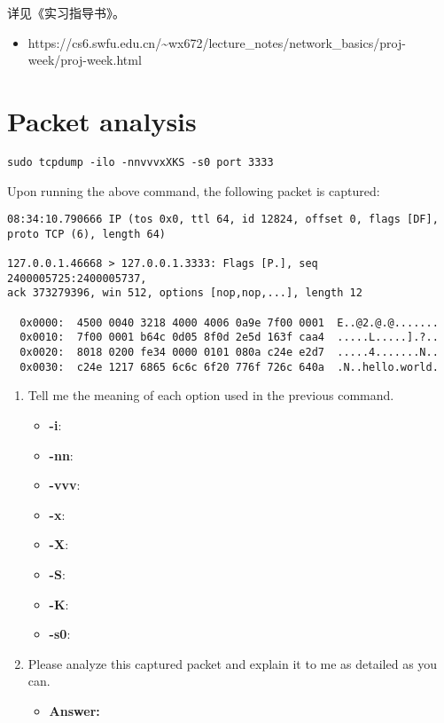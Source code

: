 \documentclass{swfulabreport}
\begin{document}
详见《实习指导书》。

\begin{itemize}
\tightlist
\item
  https://cs6.swfu.edu.cn/\textasciitilde wx672/lecture\_notes/network\_basics/proj-week/proj-week.html
\end{itemize}

\section{Packet analysis}\label{packet-analysis}

\begin{verbatim}
sudo tcpdump -ilo -nnvvvxXKS -s0 port 3333
\end{verbatim}

Upon running the above command, the following packet is captured:

\begin{verbatim}
08:34:10.790666 IP (tos 0x0, ttl 64, id 12824, offset 0, flags [DF],
proto TCP (6), length 64)

127.0.0.1.46668 > 127.0.0.1.3333: Flags [P.], seq 2400005725:2400005737,
ack 373279396, win 512, options [nop,nop,...], length 12

  0x0000:  4500 0040 3218 4000 4006 0a9e 7f00 0001  E..@2.@.@.......
  0x0010:  7f00 0001 b64c 0d05 8f0d 2e5d 163f caa4  .....L.....].?..
  0x0020:  8018 0200 fe34 0000 0101 080a c24e e2d7  .....4.......N..
  0x0030:  c24e 1217 6865 6c6c 6f20 776f 726c 640a  .N..hello.world.
\end{verbatim}

\begin{enumerate}
\def\labelenumi{\arabic{enumi}.}
\item
  Tell me the meaning of each option used in the previous command.

  \begin{itemize}
  \tightlist
  \item
    \textbf{-i}:
  \item
    \textbf{-nn}:
  \item
    \textbf{-vvv}:
  \item
    \textbf{-x}:
  \item
    \textbf{-X}:
  \item
    \textbf{-S}:
  \item
    \textbf{-K}:
  \item
    \textbf{-s0}:
  \end{itemize}
\item
  Please analyze this captured packet and explain it to me as detailed
  as you can.

  \begin{itemize}
  \tightlist
  \item
    \textbf{Answer:}
  \end{itemize}
\end{enumerate}
\end{document}
